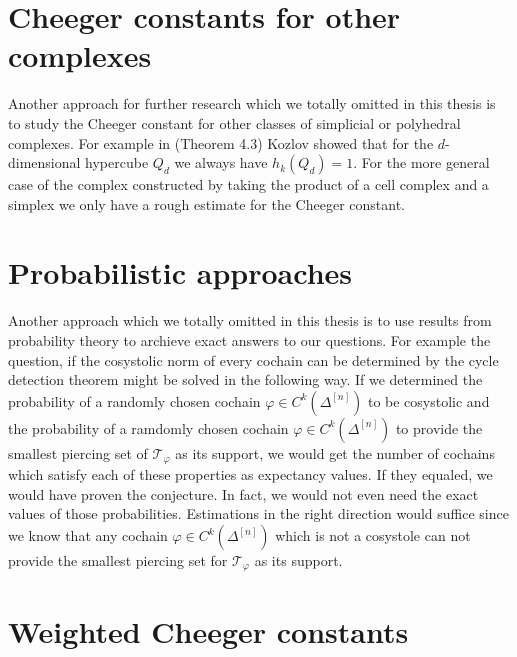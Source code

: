 \section{Cheeger constants for other complexes}

Another approach for further research which we totally omitted in this thesis is to study the Cheeger constant for other classes of simplicial or polyhedral complexes. For example in \cite{6} (Theorem 4.3) Kozlov showed that for the \(d\)-dimensional hypercube \(Q_d\) we always have \(h_k(Q_d)=1\). For the more general case of the complex constructed by taking the product of a cell complex and a simplex we only have a rough estimate for the Cheeger constant.

\section{Probabilistic approaches}

Another approach which we totally omitted in this thesis is to use results from probability theory to archieve exact answers to our questions. For example the question, if the cosystolic norm of every cochain can be determined by the cycle detection theorem might be solved in the following way. If we determined the probability of a randomly chosen cochain \(\varphi\in C^k(\Delta^{[n]})\) to be cosystolic and the probability of a ramdomly chosen cochain \(\varphi\in C^k(\Delta^{[n]})\) to provide the smallest piercing set of \(\mathcal{T}_{\varphi}\) as its support, we would get the number of cochains which satisfy each of these properties as expectancy values. If they equaled, we would have proven the conjecture. In fact, we would not even need the exact values of those probabilities. Estimations in the right direction would suffice since we know that any cochain \(\varphi\in C^k(\Delta^{[n]})\) which is not a cosystole can not provide the smallest piercing set for \(\mathcal{T}_{\varphi}\) as its support.

\section{Weighted Cheeger constants}